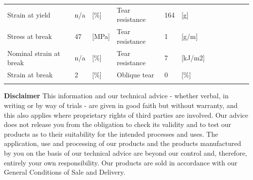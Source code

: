 \documentclass{article}
\begin{document}
\begin{center}
{\begin{tabularx}{\textwidth}{ X l X l X l X l X l X l }
			Strain at yield                            & n/a                   & [\%]          & Tear resistance    & 164                   & [g]           \\
			\arrayrulecolor{line_color}\hline
			Stress at break                            & 47                    & [MPa]         & Tear resistance    & 1                     & [g/m]         \\
			\arrayrulecolor{line_color}\hline
			Nominal strain at break                    & n/a                   & [\%]          & Tear resistance    & 7                     & [kJ/m2]       \\
			\arrayrulecolor{line_color}\hline
			Strain at break                            & 2                     & [\%]          & Oblique tear       & 0                     & [\%]          \\
			\arrayrulecolor{line_color}\hline
		\end{tabularx}
	}
\end{center}

\vspace*{\fill}
\footnotesize{
	\textbf{Disclaimer} This information and our technical advice - whether verbal, in writing or by way of trials - are given in good faith but without warranty, and this also applies
	where proprietary rights of third parties are involved. Our advice does not release you from the obligation to check its validity and to test our products as to their
	suitability for the intended processes and uses. The application, use and processing of our products and the products manufactured by you on the basis of our technical
	advice are beyond our control and, therefore, entirely your own responsibility. Our products are sold in accordance with our General Conditions of Sale and Delivery.
}
\end{document}
